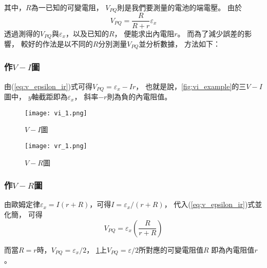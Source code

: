 \documentclass[12pt]{article}
\begin{document}
           \noindent 其中，$R$為一已知的可變電阻，
           $V_{PQ}$則是我們要測量的電池的端電壓。
           由於
           \begin{equation}
               \label{eq:vpq_mpsilon}
           V_{PQ}=\frac{R}{R+r}\varepsilon_{x}
           \end{equation}
           透過測得的$V_{PQ}$與$\varepsilon_{x}$，以及已知的$R$，
           便能求出內電阻$r$。
           而為了減少誤差的影響，
           較好的作法是以不同的$R$分別測量$V_{PQ}$並分析數據，
           方法如下：
           
            \subsubsection{作$V-I$圖}
                由(\ref{eq:v_epsilon_ir})式可得$V_{PQ}=\varepsilon_{x}-Ir$，
                也就是說，\ref{fig:vi_example}的三$V-I$圖中，
                $y$軸截距即為$\varepsilon_{x}$，
                斜率$-r$則為負的內電阻值。

            \begin{figure}[h]
                \begin{minipage}{0.5\textwidth}
                    \centering
                    \texttt{[image: vi\_1.png]}
                    \caption{$V-I$圖}
                    \label{fig:vi_example}
                \end{minipage}
                \begin{minipage}{0.5\textwidth}
                    \centering
                    \texttt{[image: vr\_1.png]}
                    \caption{$V-R$圖}
                    \label{fig:vr_example}
                \end{minipage}
            \end{figure}

            \subsubsection{作$V-R$圖}

            由歐姆定律$\varepsilon_x=I(r+R)$，可得$I=\varepsilon_x / (r+R)$，
            代入(\ref{eq:v_epsilon_ir})式並化簡，
            可得
            \begin{equation}
                \label{eq:vr}
            V_{PQ}=\varepsilon_x(\frac{R}{r+R})
            \end{equation}

            而當$R=r$時，$V_{PQ}=\varepsilon_{x}/2$，
            \ref{fig:vr_example}上$V_{PQ}=\varepsilon/2$所對應的可變電阻值$R$
            即為內電阻值$r$。
                
\end{document}
